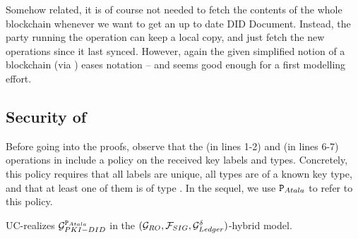 Somehow related, it is of course not needed to fetch the contents of the whole
blockchain whenever we want to get an up to date DID Document. Instead, the
party running the operation can keep a local copy, and just fetch the new
operations since it last synced. However, again the given simplified notion of
a blockchain (via \IdealGdledger) eases notation -- and seems good enough for a
first modelling effort.

\subsection{Security of \RealPKIDIDAtala}
\label{ssec:sec-didatala}

Before going into the proofs, observe that the  (in lines 1-2) and
 (in lines 6-7) operations in \RealPKIDIDAtala include a policy on
the received key labels and types. Concretely, this policy requires that all
labels are unique, all types are of a known key type, and that at least one of
them is of type \MasterKey. In the sequel, we use $\P_{Atala}$ to refer to this
policy.


\begin{theorem}
  \label{thm:sec-didatala}
  \RealPKIDIDAtala UC-realizes $\IdealGPKIDID^{\P_{Atala}}$ in the $(\IdealGRO,
  \IdealFSig, \IdealGdledger)$-hybrid model.
\end{theorem}


